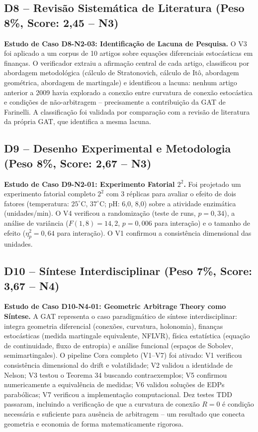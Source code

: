 \subsection{D8 -- Revisão Sistemática de Literatura (Peso 8\%, Score: 2,45 -- N3)}

\textbf{Estudo de Caso D8-N2-03: Identificação de Lacuna de Pesquisa.} O
V3 foi aplicado a um corpus de 10 artigos sobre equações diferenciais
estocásticas em finanças. O verificador extraiu a afirmação central de
cada artigo, classificou por abordagem metodológica (cálculo de
Stratonovich, cálculo de Itô, abordagem geométrica, abordagem de
martingale) e identificou a lacuna: nenhum artigo anterior a 2009 havia
explorado a conexão entre curvatura de conexão estocástica e condições
de não-arbitragem -- precisamente a contribuição da GAT de Farinelli. A
classificação foi validada por comparação com a revisão de literatura da
própria GAT, que identifica a mesma lacuna.

\subsection{D9 -- Desenho Experimental e Metodologia (Peso 8\%, Score: 2,67 -- N3)}

\textbf{Estudo de Caso D9-N2-01: Experimento Fatorial $2^2$.} Foi
projetado um experimento fatorial completo $2^2$ com 3 réplicas para
avaliar o efeito de dois fatores (temperatura: $25^\circ$C, $37^\circ$C;
pH: 6,0, 8,0) sobre a atividade enzimática (unidades/min). O V4
verificou a randomização (teste de runs, $p = 0{,}34$), a análise de
variância ($F(1,8) = 14{,}2$, $p = 0{,}006$ para interação) e o tamanho
de efeito ($\eta^2_p = 0{,}64$ para interação). O V1 confirmou a
consistência dimensional das unidades.

\subsection{D10 -- Síntese Interdisciplinar (Peso 7\%, Score: 3,67 -- N4)}

\textbf{Estudo de Caso D10-N4-01: Geometric Arbitrage Theory como Síntese.}
A GAT representa o caso paradigmático de síntese interdisciplinar: integra
geometria diferencial (conexões, curvatura, holonomia), finanças
estocásticas (medida martingale equivalente, NFLVR), física estatística
(equação de continuidade, fluxo de entropia) e análise funcional (espaços
de Sobolev, semimartingales). O pipeline Cora completo (V1--V7) foi
ativado: V1 verificou consistência dimensional do drift e volatilidade;
V2 validou a identidade de Nelson; V3 testou o Teorema 34 buscando
contraexemplos; V5 confirmou numericamente a equivalência de medidas;
V6 validou soluções de EDPs parabólicas; V7 verificou a implementação
computacional. Dez testes TDD passaram, incluindo a verificação de que
a curvatura de conexão $R = 0$ é condição necessária e suficiente para
ausência de arbitragem -- um resultado que conecta geometria e economia
de forma matematicamente rigorosa.

